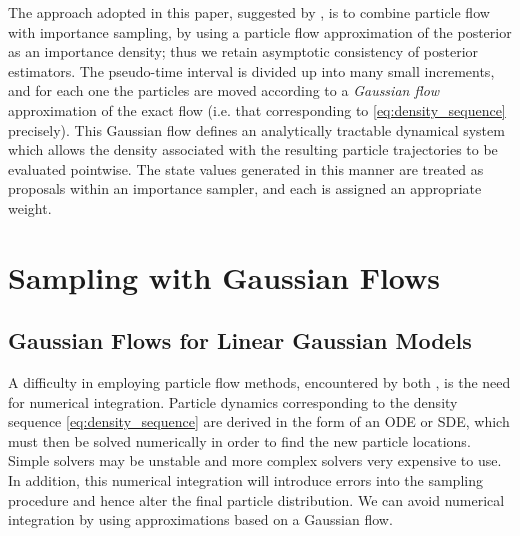 \documentclass[12pt]{article}
\begin{document}
The approach adopted in this paper, suggested by \cite{Reich2012}, is to combine particle flow with importance sampling, by using a particle flow approximation of the posterior as an importance density; thus we retain asymptotic consistency of posterior estimators. The pseudo-time interval is divided up into many small increments, and for each one the particles are moved according to a \emph{Gaussian flow} approximation of the exact flow (i.e. that corresponding to \eqref{eq:density_sequence} precisely). This Gaussian flow defines an analytically tractable dynamical system which allows the density associated with the resulting particle trajectories to be evaluated pointwise. The state values generated in this manner are treated as proposals within an importance sampler, and each is assigned an appropriate weight.



\section{Sampling with Gaussian Flows}

\subsection{Gaussian Flows for Linear Gaussian Models}

A difficulty in employing particle flow methods, encountered by both \cite{Daum2011d,Reich2011}, is the need for numerical integration. Particle dynamics corresponding to the density sequence \eqref{eq:density_sequence} are derived in the form of an ODE or SDE, which must then be solved numerically in order to find the new particle locations. Simple solvers may be unstable and more complex solvers very expensive to use. In addition, this numerical integration will introduce errors into the sampling procedure and hence alter the final particle distribution. We can avoid numerical integration by using approximations based on a Gaussian flow.
\end{document}
